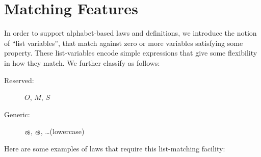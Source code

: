 \section{Matching Features}\label{sec:match-feat}

In order to support alphabet-based laws and definitions,
we introduce the notion of ``list variables'',
that match against zero or more variables satisfying some property.
These list-variables encode simple expressions that give
some flexibility in how they match.
We further classify as follows:
\begin{description}
  \item[Reserved:]  $O$, $M$, $S$
  \item[Generic:] $v\!{\scriptstyle{\mathsf{\$}}}$, $e\!{\scriptstyle{\mathsf{\$}}}$, \ldots (lowercase)
\end{description}
Here are some examples of laws that require this list-matching facility:
